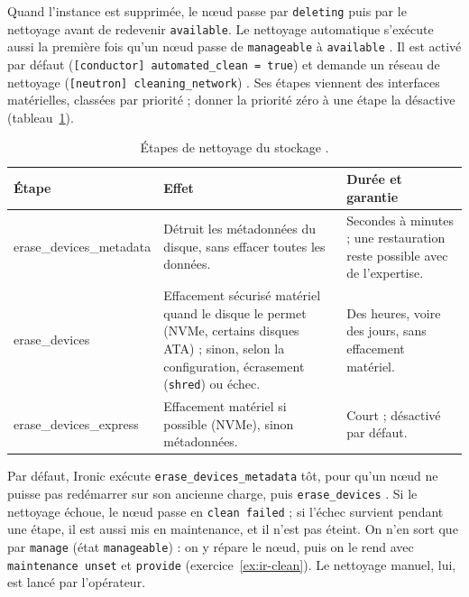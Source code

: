 Quand l'instance est supprimée, le nœud passe par \texttt{deleting} puis par le \gls{nettoyage} avant de redevenir
\texttt{available}. Le nettoyage automatique s'exécute aussi la première fois qu'un nœud passe de \texttt{manageable} à
\texttt{available} \parencite{ironic-cleaning}. Il est activé par défaut (\texttt{[conductor] automated\_\allowbreak clean = true})
et demande un réseau de nettoyage (\texttt{[neutron] cleaning\_\allowbreak network}) \parencite{ironic-configure-cleaning}. Ses
étapes viennent des interfaces matérielles, classées par priorité ; donner la priorité zéro à une étape la désactive
(tableau~\ref{tab:ir-nettoyage}).

\begin{table}[!ht]
\centering
\renewcommand{\arraystretch}{1.3}
\begin{tabular}{@{}>{\raggedright\arraybackslash\ttfamily\small}p{4.4cm}>{\raggedright\arraybackslash}p{6.4cm}>{\raggedright\arraybackslash}p{4.7cm}@{}}
\toprule
\textrm{\textbf{Étape}} & \textbf{Effet} & \textbf{Durée et garantie} \\
\midrule
erase\_devices\_metadata & Détruit les métadonnées du disque, sans effacer toutes les données. & Secondes à minutes ; une restauration reste possible avec de l'expertise. \\
erase\_devices & Effacement sécurisé matériel quand le disque le permet (NVMe, certains disques ATA) ; sinon, selon la configuration, écrasement (\texttt{shred}) ou échec. & Des heures, voire des jours, sans effacement matériel. \\
erase\_devices\_express & Effacement matériel si possible (NVMe), sinon métadonnées. & Court ; désactivé par défaut. \\
\bottomrule
\end{tabular}
\caption{Étapes de nettoyage du stockage \parencite{ironic-cleaning}.}
\label{tab:ir-nettoyage}
\end{table}

Par défaut, Ironic exécute \texttt{erase\_\allowbreak devices\_\allowbreak metadata} tôt, pour qu'un nœud ne puisse pas redémarrer
sur son ancienne charge, puis \texttt{erase\_\allowbreak devices} \parencite{ironic-cleaning}. Si le nettoyage échoue, le nœud passe en
\texttt{clean failed} ; si l'échec survient pendant une étape, il est aussi mis en maintenance, et il n'est pas éteint. On n'en
sort que par \texttt{manage} (état \texttt{manageable}) : on y répare le nœud, puis on le rend avec \texttt{maintenance unset}
et \texttt{provide} (exercice~\ref{ex:ir-clean}). Le nettoyage manuel, lui, est lancé par l'opérateur.

